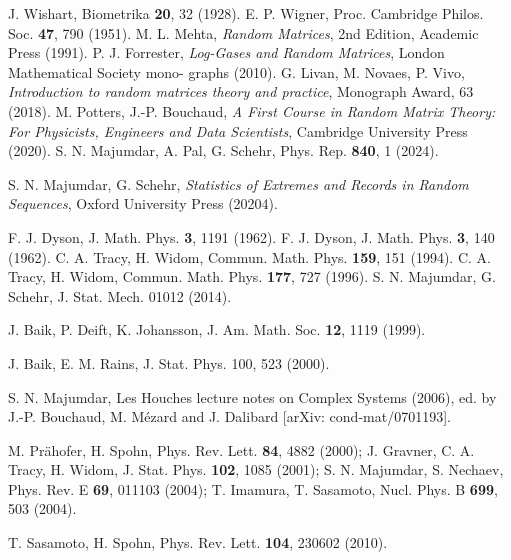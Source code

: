 \documentclass[onecolumn,superscriptaddress,
 amsmath,amssymb,
 aps,
 prd,
]{revtex4-1}
\begin{document}
\begin{thebibliography}{1}

 J. Wishart, Biometrika {\bf 20}, 32 (1928).
 E. P. Wigner, Proc. Cambridge Philos. Soc. {\bf 47}, 790 (1951).
 M. L. Mehta, {\it Random Matrices}, 2nd Edition, Academic Press (1991).
 P. J. Forrester, {\it Log-Gases and Random Matrices}, London Mathematical Society mono- graphs (2010).
 G. Livan, M. Novaes, P. Vivo, {\it Introduction to random matrices theory and practice}, Monograph Award, 63 (2018).
 M. Potters, J.-P. Bouchaud, {\it A First Course in Random Matrix Theory: For Physicists, Engineers and Data Scientists}, Cambridge University Press (2020).
S. N. Majumdar, A. Pal, G. Schehr, Phys. Rep. {\bf 840}, 1 (2024).

S. N. Majumdar, G. Schehr, {\it Statistics of Extremes and Records in Random Sequences}, Oxford University Press (20204).


 F. J. Dyson, J. Math. Phys. {\bf 3}, 1191 (1962). %
 F. J. Dyson, J. Math. Phys. {\bf 3}, 140 (1962). %
 C. A. Tracy, H. Widom, Commun. Math. Phys. {\bf 159}, 151 (1994).
 C. A. Tracy, H. Widom, Commun. Math. Phys. {\bf 177}, 727 (1996).
 S. N. Majumdar, G. Schehr, J. Stat. Mech. 01012 (2014). 
%



 J. Baik, P. Deift, K. Johansson, J. Am. Math. Soc. {\bf 12}, 1119 (1999).

 J. Baik, E. M. Rains, J. Stat. Phys. 100, 523 (2000).

 S. N. Majumdar, Les Houches lecture notes on Complex Systems (2006), ed. by J.-P. Bouchaud,
M. M\'ezard and J. Dalibard [arXiv: cond-mat/0701193].



 M. Pr{\"a}hofer, H. Spohn, Phys. Rev. Lett. {\bf 84}, 4882 (2000); J. Gravner, C. A. Tracy, H. Widom,
J. Stat. Phys. {\bf 102}, 1085 (2001); S. N. Majumdar, S. Nechaev, Phys. Rev. E {\bf 69}, 011103 (2004);
T. Imamura, T. Sasamoto, Nucl. Phys. B {\bf 699}, 503 (2004).


 T. Sasamoto, H. Spohn, Phys. Rev. Lett. {\bf 104}, 230602 (2010).


\end{thebibliography}
\end{document}
